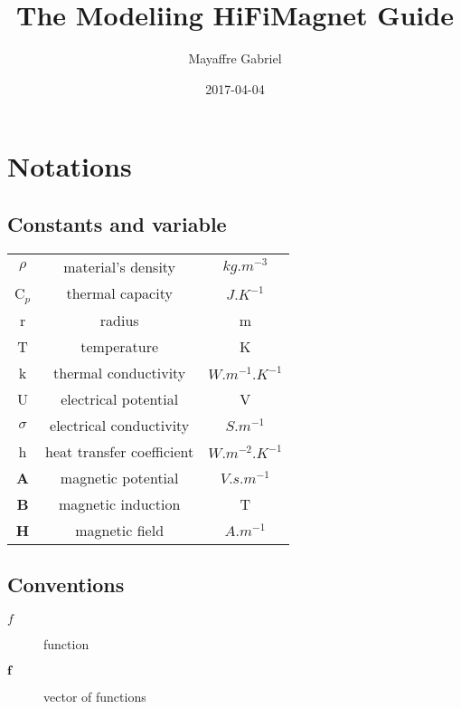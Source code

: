 \documentclass[11pt]{amsart}
\title{The Modeliing HiFiMagnet Guide}
\author{Mayaffre Gabriel}
\date{2017-04-04}
\begin{document}
\maketitle
\tableofcontents
\hypertarget{x-\textbf{notations}}{\section{\textbf{Notations}}}
\hypertarget{x-constants-and-variable}{\subsection{Constants and variable}}
\begin{center}
\begin{tabular}{|c|c|c|}
\hline
$\rho$ & material’s density & $kg.m^{-3}$ \\ 
C${}_{p}$ & thermal capacity & $J.K^{-1}$ \\ 
r & radius & m \\ 
T & temperature & K \\ 
k & thermal conductivity & $W.m^{-1} .K^{-1}$ \\ 
U & electrical potential & V \\ 
$\sigma$ & electrical conductivity & $S.m^{-1}$ \\ 
h & heat transfer coefficient & $W.m^{-2} .K^{-1}$ \\ 
\textbf{A} & magnetic potential & $V.s.m^{-1}$ \\ 
\textbf{B} & magnetic induction & T \\ 
\textbf{H} & magnetic field & $A.m^{-1}$ \\ 
\hline
\end{tabular}
\end{center}

\hypertarget{x-conventions}{\subsection{Conventions}}
\begin{description}

\item[$f$]function

\item[$\textbf{f}$]vector of functions

\end{description}
\end{document}
